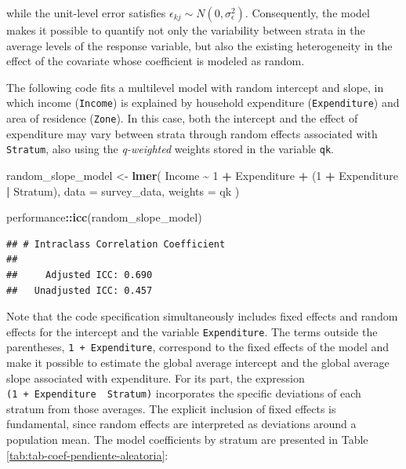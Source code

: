 \documentclass[
  english,
  12pt,
]{book}
\newenvironment{Shaded}{\begin{snugshade}}{\end{snugshade}}
\newcommand{\AttributeTok}[1]{\textcolor[rgb]{0.13,0.29,0.53}{#1}}
\newcommand{\DecValTok}[1]{\textcolor[rgb]{0.00,0.00,0.81}{#1}}
\newcommand{\FunctionTok}[1]{\textcolor[rgb]{0.13,0.29,0.53}{\textbf{#1}}}
\newcommand{\NormalTok}[1]{#1}
\newcommand{\OtherTok}[1]{\textcolor[rgb]{0.56,0.35,0.01}{#1}}
\newcommand{\SpecialCharTok}[1]{\textcolor[rgb]{0.81,0.36,0.00}{\textbf{#1}}}
\begin{document}
while the unit-level error satisfies \(\epsilon_{kj} \sim N(0,\sigma_{\epsilon}^{2})\). Consequently, the model makes it possible to quantify not only the variability between strata in the average levels of the response variable, but also the existing heterogeneity in the effect of the covariate whose coefficient is modeled as random.

The following code fits a multilevel model with random intercept and slope, in which income (\texttt{Income}) is explained by household expenditure (\texttt{Expenditure}) and area of residence (\texttt{Zone}). In this case, both the intercept and the effect of expenditure may vary between strata through random effects associated with \texttt{Stratum}, also using the \emph{q-weighted} weights stored in the variable \texttt{qk}.

\begin{Shaded}
\begin{Highlighting}[]
\NormalTok{random\_slope\_model }\OtherTok{\textless{}{-}} \FunctionTok{lmer}\NormalTok{(}
\NormalTok{  Income }\SpecialCharTok{\textasciitilde{}} \DecValTok{1} \SpecialCharTok{+}\NormalTok{ Expenditure }\SpecialCharTok{+}\NormalTok{ (}\DecValTok{1} \SpecialCharTok{+}\NormalTok{ Expenditure }\SpecialCharTok{|}\NormalTok{ Stratum),}
  \AttributeTok{data =}\NormalTok{ survey\_data,}
  \AttributeTok{weights =}\NormalTok{ qk}
\NormalTok{)}

\NormalTok{performance}\SpecialCharTok{::}\FunctionTok{icc}\NormalTok{(random\_slope\_model)}
\end{Highlighting}
\end{Shaded}

\begin{verbatim}
## # Intraclass Correlation Coefficient
## 
##     Adjusted ICC: 0.690
##   Unadjusted ICC: 0.457
\end{verbatim}

Note that the code specification simultaneously includes fixed effects and random effects for the intercept and the variable \texttt{Expenditure}. The terms outside the parentheses, \texttt{1\ +\ Expenditure}, correspond to the fixed effects of the model and make it possible to estimate the global average intercept and the global average slope associated with expenditure. For its part, the expression \texttt{(1\ +\ Expenditure\ \textbar{}\ Stratum)} incorporates the specific deviations of each stratum from those averages. The explicit inclusion of fixed effects is fundamental, since random effects are interpreted as deviations around a population mean. The model coefficients by stratum are presented in Table \ref{tab:tab-coef-pendiente-aleatoria}:
\end{document}
